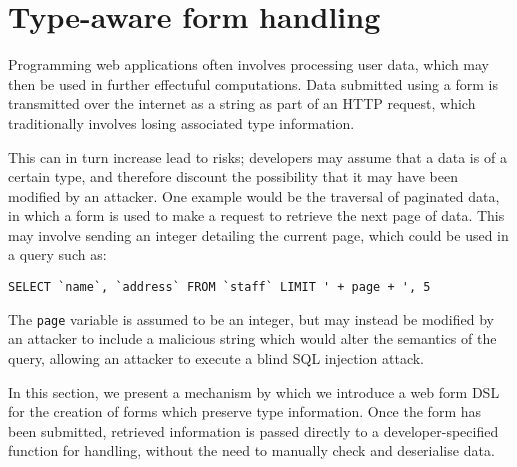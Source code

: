 \documentclass[preprint]{sigplanconf}
\begin{document}

\section{Type-aware form handling}
\label{form}
Programming web applications often involves processing user data, which may then be used in further effectuful computations. Data submitted using a form is transmitted over the internet as a string as part of an HTTP request, which traditionally involves losing associated type information. 

This can in turn increase lead to risks; developers may assume that a data is of a certain type, and therefore discount the possibility that it may have been modified by an attacker. One example would be the traversal of paginated data, in which a form is used to make a request to retrieve the next page of data. This may involve sending an integer detailing the current page, which could be used in a query such as:

{\small
\begin{verbatim}
SELECT `name`, `address` FROM `staff` LIMIT ' + page + ', 5
\end{verbatim}
}
The \texttt{page} variable is assumed to be an integer, but may instead be modified by an attacker to include a malicious string which would alter the semantics of the query, allowing an attacker to execute a blind SQL injection attack. %

In this section, we present a mechanism by which we introduce a web form DSL for the creation of forms which preserve type information. Once the form has been submitted, retrieved information is passed directly to a developer-specified function for handling, without the need to manually check and deserialise data. 
\end{document}
